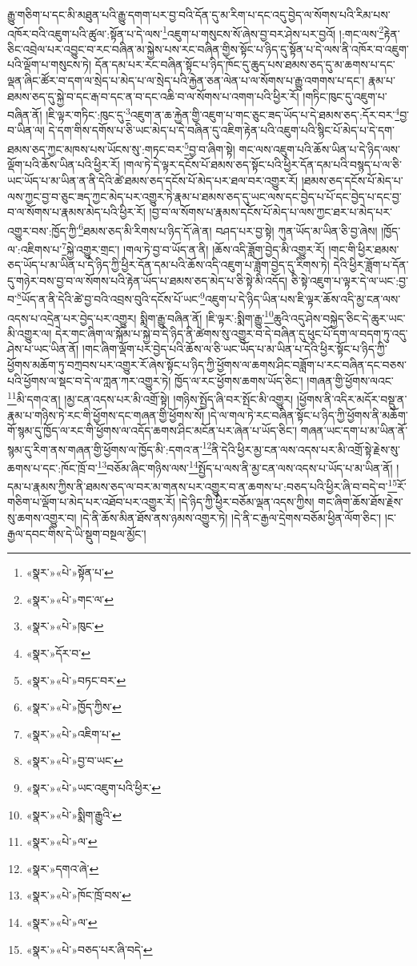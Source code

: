 རྒྱུ་གཅིག་པ་དང་མི་མཐུན་པའི་རྒྱུ་དགག་པར་བྱ་བའི་དོན་དུ་མ་རིག་པ་དང་འདུ་བྱེད་ལ་སོགས་པའི་རིམ་པས་འཁོར་བའི་འཇུག་པའི་ཚུལ་:སྟོན་པ་དེ་ལས་\footnote{«སྣར་»«པེ་»སྟོན་པ་}འཇུག་པ་གསུངས་སོ་ཞེས་བྱ་བར་ཤེས་པར་བྱའོ། །:གང་ལས་\footnote{«སྣར་»«པེ་»གང་ལ་}རྟེན་ཅིང་འབྲེལ་པར་འབྱུང་བ་རང་བཞིན་མ་སྐྱེས་པས་རང་བཞིན་གྱིས་སྟོང་པ་ཉིད་དུ་སྟོན་པ་དེ་ལས་ནི་འཁོར་བ་འཇུག་པའི་ལྡོག་པ་གསུངས་ཏེ། དོན་དམ་པར་རང་བཞིན་སྟོང་པ་ཉིད་ཁོང་དུ་ཆུད་པས་ཐམས་ཅད་དུ་མ་ཆགས་པ་དང་ལྡན་ཞིང་ཚོར་བ་དག་ལ་སྲེད་པ་མེད་པ་ལ་སྲེད་པའི་རྐྱེན་ཅན་ལེན་པ་ལ་སོགས་པ་རྒྱུ་འགགས་པ་དང་། རྣམ་པ་ཐམས་ཅད་དུ་སྐྱེ་བ་དང་རྒ་བ་དང་ན་བ་དང་འཆི་བ་ལ་སོགས་པ་འགག་པའི་ཕྱིར་རོ། །གཏིང་ཁུང་དུ་འཇུག་པ་བཞིན་ནོ། །ཇི་ལྟར་གཏིང་:ཁུང་དུ་\footnote{«སྣར་»«པེ་»ཁུང་}འཇུག་ན་ཆ་རྐྱེན་གྱི་འཇུག་པ་གང་ཅུང་ཟད་ཡོད་པ་དེ་ཐམས་ཅད་:དོར་བར་\footnote{«སྣར་»དོར་བ་}བྱ་བ་ཡིན་ལ། དེ་དག་གིས་དགོས་པ་ཅི་ཡང་མེད་པ་དེ་བཞིན་དུ་འཇིག་རྟེན་པའི་འཇུག་པའི་སྙིང་པོ་མེད་པ་དེ་དག་ཐམས་ཅད་ཀྱང་མཁས་པས་ཡོངས་སུ་:གཏང་བར་\footnote{«སྣར་»«པེ་»བཏང་བར་}བྱ་བ་ཞིག་སྟེ། གང་ལས་འཇུག་པའི་ཆོས་ཡིན་པ་དེ་ཉིད་ལས་ལྡོག་པའི་ཆོས་ཡིན་པའི་ཕྱིར་རོ། །གལ་ཏེ་དེ་ལྟར་དངོས་པོ་ཐམས་ཅད་སྟོང་པའི་ཕྱིར་དོན་དམ་པའི་བསྙད་པ་ལ་ཅི་ཡང་ཡོད་པ་མ་ཡིན་ན་ནི་དེའི་ཚེ་ཐམས་ཅད་དངོས་པོ་མེད་པར་ཐལ་བར་འགྱུར་རོ། །ཐམས་ཅད་དངོས་པོ་མེད་པ་ལས་ཀྱང་བྱ་བ་ཅུང་ཟད་ཀྱང་མེད་པར་འགྱུར་ཏེ་རྣམ་པ་ཐམས་ཅད་དུ་ཡང་ལས་དང་བྱེད་པ་པོ་དང་བྱེད་པ་དང་བྱ་བ་ལ་སོགས་པ་རྣམས་མེད་པའི་ཕྱིར་རོ། །བྱ་བ་ལ་སོགས་པ་རྣམས་དངོས་པོ་མེད་པ་ལས་ཀྱང་ཐར་པ་མེད་པར་འགྱུར་བས་:ཁྱོད་ཀྱི་\footnote{«སྣར་»«པེ་»ཁྱོད་ཀྱིས་}ཐམས་ཅད་མི་རིགས་པ་ཉིད་དོ་ཞེ་ན། བཤད་པར་བྱ་སྟེ། ཀུན་ཡོད་མ་ཡིན་ཅི་བྱ་ཞེས། །ཁྱོད་ལ་:འཇིགས་པ་\footnote{«སྣར་»«པེ་»འཇིག་པ་}སྐྱེ་འགྱུར་གྲང་། །གལ་ཏེ་བྱ་བ་ཡོད་ན་ནི། །ཆོས་འདི་ཟློག་བྱེད་མི་འགྱུར་རོ། །གང་གི་ཕྱིར་ཐམས་ཅད་ཡོད་པ་མ་ཡིན་པ་དེ་ཉིད་ཀྱི་ཕྱིར་དོན་དམ་པའི་ཆོས་འདི་འཇུག་པ་ཟློག་བྱེད་དུ་རིགས་ཏེ། དེའི་ཕྱིར་ཟློག་པ་དོན་དུ་གཉེར་བས་བྱ་བ་ལ་སོགས་པའི་རྟེན་ཡོད་པ་ཐམས་ཅད་མེད་པ་ཅི་སྟེ་མི་འདོད། ཅི་སྟེ་འཇུག་པ་ལྟར་དེ་ལ་ཡང་:བྱ་བ་\footnote{«སྣར་»«པེ་»བྱ་བ་ཡང་}ཡོད་ན་ནི་དེའི་ཚེ་བྱ་བའི་འབྲས་བུའི་དངོས་པོ་ཡང་\footnote{«སྣར་»«པེ་»ཡང་འཇུག་པའི་ཕྱིར་}འཇུག་པ་དེ་ཉིད་ཡིན་པས་ཇི་ལྟར་ཆོས་འདི་མྱ་ངན་ལས་འདས་པ་འདྲེན་པར་བྱེད་པར་འགྱུར། སྨིག་རྒྱུ་བཞིན་ནོ། །ཇི་ལྟར་:སྨིག་རྒྱུ་\footnote{«སྣར་»«པེ་»སྨིག་རྒྱུའི་}ཆུའི་འདུ་ཤེས་བསྐྱེད་ཅིང་དེ་ཆུར་ཡང་མི་འགྱུར་ལ། དེར་གང་ཞིག་ལ་སྐོམ་པ་སྐྱེ་བ་དེ་ཉིད་ནི་ཚེགས་སུ་འགྱུར་བ་དེ་བཞིན་དུ་ཕུང་པོ་དག་ལ་བདག་ཏུ་འདུ་ཤེས་པ་ཡང་ཡིན་ནོ། །གང་ཞིག་ལྡོག་པར་བྱེད་པའི་ཆོས་ལ་ཅི་ཡང་ཡོད་པ་མ་ཡིན་པ་དེའི་ཕྱིར་སྟོང་པ་ཉིད་ཀྱི་ཕྱོགས་མཆོག་ཏུ་བཀྲབས་པར་འགྱུར་རོ་ཞེས་སྟོང་པ་ཉིད་ཀྱི་ཕྱོགས་ལ་ཆགས་ཤིང་བཟློག་པ་རང་བཞིན་དང་བཅས་པའི་ཕྱོགས་ལ་སྡང་བ་དེ་ལ་ཀླན་ཀར་འགྱུར་ཏེ། ཁྱོད་ལ་རང་ཕྱོགས་ཆགས་ཡོད་ཅིང་། །གཞན་གྱི་ཕྱོགས་ལའང་\footnote{«སྣར་»«པེ་»ལ་}མི་དགའ་ན། །མྱ་ངན་འདས་པར་མི་འགྲོ་སྟེ། །གཉིས་སྤྱོད་ཞི་བར་སྤོང་མི་འགྱུར། །ཕྱོགས་ནི་འདིར་མདོར་བསྡུ་ན་རྣམ་པ་གཉིས་ཏེ་རང་གི་ཕྱོགས་དང་གཞན་གྱི་ཕྱོགས་སོ། །དེ་ལ་གལ་ཏེ་རང་བཞིན་སྟོང་པ་ཉིད་ཀྱི་ཕྱོགས་ནི་མཆོག་གོ་སྙམ་དུ་ཁྱོད་ལ་རང་གི་ཕྱོགས་ལ་འདོད་ཆགས་ཤིང་མངོན་པར་ཞེན་པ་ཡོད་ཅིང་། གཞན་ཡང་དག་པ་མ་ཡིན་ནོ་སྙམ་དུ་རིག་ནས་གཞན་གྱི་ཕྱོགས་ལ་ཁྱོད་མི་:དགའ་ན་\footnote{«སྣར་»དགའ་ཞེ་}ནི་དེའི་ཕྱིར་མྱ་ངན་ལས་འདས་པར་མི་འགྲོ་སྟེ་རྗེས་སུ་ཆགས་པ་དང་:ཁོང་ཁྲོ་བ་\footnote{«སྣར་»«པེ་»ཁོང་ཁྲོ་བས་}བཅོམ་ཞིང་གཉིས་ལས་\footnote{«སྣར་»«པེ་»ལ་}སྤྱོད་པ་ལས་ནི་མྱ་ངན་ལས་འདས་པ་ཡོད་པ་མ་ཡིན་ནོ། །དམ་པ་རྣམས་ཀྱིས་ནི་ཐམས་ཅད་ལ་བར་མ་གནས་པར་འགྱུར་བ་ན་ཆགས་པ་:བཅད་པའི་ཕྱིར་ཞི་བ་བདེ་བ་\footnote{«སྣར་»«པེ་»བཅད་པར་ཞི་བདེ་}རོ་གཅིག་པ་ལྡོག་པ་མེད་པར་འཐོབ་པར་འགྱུར་རོ། །དེ་ཉིད་ཀྱི་ཕྱིར་བཅོམ་ལྡན་འདས་ཀྱིས། གང་ཞིག་ཆོས་ཐོས་རྗེས་སུ་ཆགས་འགྱུར་བ། །དེ་ནི་ཆོས་མིན་ཐོས་ནས་ཉམས་འགྱུར་ཏེ། །དེ་ནི་ང་རྒྱལ་དྲེགས་བཅོམ་ཕྱིན་ལོག་ཅིང་། །ང་རྒྱལ་དབང་གིས་དེ་ཡི་སྡུག་བསྔལ་མྱོང་། 